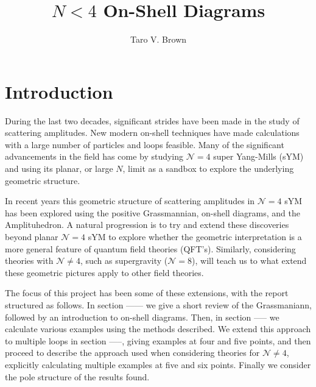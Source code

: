 \documentclass[letter,11pt]{article}
\title{$N<4$ On-Shell Diagrams}
\author[a]{Taro V. Brown}
\affiliation[a]{Department of Physics, UC Davis, One Shields Avenue, Davis, CA 95616, USA }
\begin{document}
 
\maketitle
\flushbottom
\newpage
\section{Introduction}
During the last two decades, significant strides have been made in the study of scattering amplitudes. New modern on-shell techniques have made calculations with a large number of particles and loops feasible. Many of the significant advancements in the field has come by studying $\mathcal N = 4$ super Yang-Mills (sYM)
and using its planar, or large $N$, limit as a sandbox to explore the underlying geometric structure. 

In recent years this geometric structure of scattering amplitudes in $\mathcal N = 4$
sYM has been explored using the positive Grassmannian, on-shell diagrams, and
the Amplituhedron. A natural progression is to try and extend these discoveries beyond planar $\mathcal N = 4$ sYM to explore whether the geometric interpretation is a more general feature of quantum field theories (QFT’s). Similarly, considering theories with $\mathcal N\neq 4$, such as supergravity ($\mathcal N = 8$), will teach us to what extend these geometric pictures apply to other field theories. 

The focus of this project has been some of these extensions, with the report structured as follows. In section ------ we give a short review of the Grassmaniann, followed by an introduction to on-shell diagrams. Then, in section ----- we calculate various examples using the methods described. We extend this approach to multiple loops in section -----, giving examples at four and five points, and then proceed to describe the approach used when considering theories for $\mathcal{N}\neq 4$, explicitly calculating multiple examples at five and six points. Finally we consider the pole structure of the results found.
\end{document}
